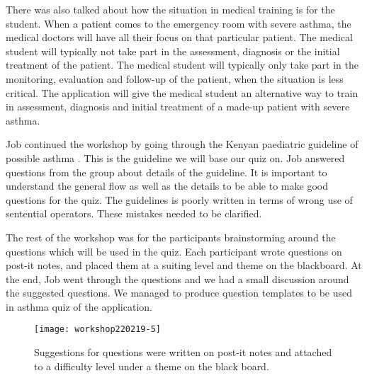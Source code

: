  There was also talked about how the situation in medical training is for the student. When a patient comes to the emergency room with severe asthma, the medical doctors will have all their focus on that particular patient. The medical student will typically not take part in the assessment, diagnosis or the initial treatment of the patient. The medical student will typically only take part in the monitoring, evaluation and follow-up of the patient, when the situation is less critical. The application will give the medical student an alternative way to train in assessment, diagnosis and initial treatment of a made-up patient with severe asthma. 

Job continued the workshop by going through the Kenyan paediatric guideline of possible asthma \cite{RepublicofKeny2016}. This is the guideline we will base our quiz on. Job answered questions from the group about details of the guideline. It is important to understand the general flow as well as the details to be able to make good questions for the quiz. The guidelines is poorly written in terms of wrong use of sentential operators. These mistakes needed to be clarified.

The rest of the workshop was for the participants brainstorming around the questions which will be used in the quiz. Each participant wrote questions on post-it notes, and placed them at a suiting level and theme on the blackboard. At the end, Job went through the questions and we had a small discussion around the suggested questions. We managed to produce question templates to be used in asthma quiz of the application.

\begin{figure}[h!]
	\caption {Suggestions for questions were written on post-it notes and attached to a difficulty level under a theme on the black board.}
	\texttt{[image: workshop220219-5]}
\end{figure}